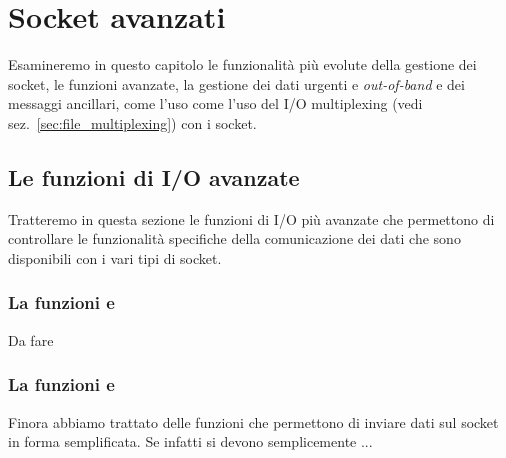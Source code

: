 
\chapter{Socket avanzati}
\label{cha:advanced_socket}


Esamineremo in questo capitolo le funzionalità più evolute della gestione dei
socket, le funzioni avanzate, la gestione dei dati urgenti e
\textit{out-of-band} e dei messaggi ancillari, come l'uso come l'uso del I/O
multiplexing (vedi sez.~\ref{sec:file_multiplexing}) con i socket.


\section{Le funzioni di I/O avanzate}
\label{sec:sock_advanced_IO}

Tratteremo in questa sezione le funzioni di I/O più avanzate che permettono di
controllare le funzionalità specifiche della comunicazione dei dati che sono
disponibili con i vari tipi di socket.

\subsection{La funzioni  e }
\label{sec:net_send_recv}

Da fare



\subsection{La funzioni  e }
\label{sec:net_sendmsg}

Finora abbiamo trattato delle funzioni che permettono di inviare dati sul
socket in forma semplificata. Se infatti si devono semplicemente ...

